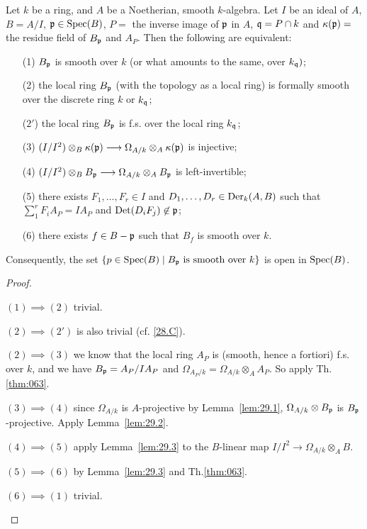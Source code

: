 \documentclass[../main]{subfiles}
\begin{document}
\begin{partheorem}
\label{thm:064}
Let $k$ be a ring, and $A$ be a Noetherian, smooth $k$-algebra. Let $I$ be an ideal of $A$, $B = A/I$, $\mathfrak{p} \in \operatorname{Spec}(B)$, $P = $ the inverse image of $\mathfrak{p}$ in $A$, $\mathfrak{q} = P \cap k$ and $\kappa(\mathfrak{p}) = $ the residue field of $B_{\mathfrak{p}}$ and $A_P$. Then the following are equivalent: 

\begin{enumerate}
    \item[(1)] $B_{\mathfrak{p}}$ is smooth over $k$ (or what amounts to the same, over $k_{\mathfrak{q}})$;
    \item[(2)] the local ring $B_{\mathfrak{p}}$ (with the topology as a local ring) is formally smooth over the discrete ring $k$ or $k_{\mathfrak{q}}$;
    \item[($2'$)] the local ring $B_{\mathfrak{p}}$ is f.s. over the local ring $k_{\mathfrak{q}}$;
    \item[(3)] $(I/I^2) \otimes_B \kappa(\mathfrak{p}) \longrightarrow \Omega_{A/k} \otimes_A \kappa(\mathfrak{p})$ is injective;
    \item[(4)] $(I/I^2) \otimes_B B_{\mathfrak{p}} \longrightarrow \Omega_{A/k} \otimes_A B_{\mathfrak{p}}$ is left-invertible;
    \item[(5)] there exists $F_1, \ldots, F_r \in I$ and $D_1, \dots, D_r \in \operatorname{Der}_k(A,B)$ such that \newline $\sum_1^r F_i A_P = IA_P$ and $\operatorname{Det}(D_i F_j) \not \in \mathfrak{p}$;
    \item[(6)] there exists $f \in B - \mathfrak{p}$ such that $B_f$ is smooth over $k$.
\end{enumerate}

Consequently, the set $\{p \in \operatorname{Spec}(B) \mid B_{\mathfrak{p}} \text { is smooth over } k\}$ is open in $\operatorname{Spec}(B)$.
\end{partheorem}

\begin{proof}\phantom{,}
\begin{implyenumerate}
    \item[$(1) \implies (2)$] trivial.
    \item[$(2) \implies (2')$] is also trivial (cf. \ref{28.C}).
    \item[$(2) \implies (3)$] we know that the local ring $A_P$ is (smooth, hence a fortiori) f.s. over $k$, and we have $B_{\mathfrak{p}} = A_P/I A_P$ and $\Omega_{A_P/k} = \Omega_{A/k} \otimes_A A_P$. So apply Th.\ref{thm:063}.
    \item[$(3) \implies (4)$] since $\Omega_{A/k}$ is $A$-projective by Lemma~\ref{lem:29.1}, $\Omega_{A/k} \otimes B_{\mathfrak{p}}$ is $B_{\mathfrak{p}}$-projective. Apply Lemma~\ref{lem:29.2}.
    \item[$(4) \implies (5)$] apply Lemma~\ref{lem:29.3} to the $B$-linear map $I/I^2 \longrightarrow \Omega_{A/k} \otimes_A B$.
    \item[$(5) \implies (6)$] by Lemma~\ref{lem:29.3} and Th.\ref{thm:063}.
    \item[$(6) \implies (1)$] trivial.
\end{implyenumerate}

\end{proof}
\end{document}
